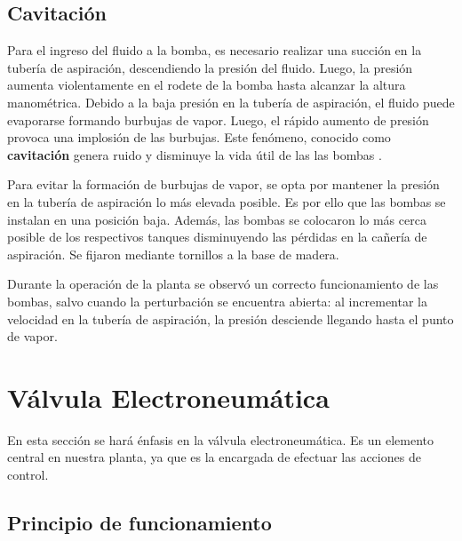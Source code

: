 \subsection{Cavitación}
\label{subsec:cavitacion}
Para el ingreso del fluido a la bomba, es necesario realizar una succión
en la tubería de aspiración, descendiendo la presión del fluido.
Luego, la presión aumenta violentamente en el rodete de la bomba hasta alcanzar
la altura manométrica.
Debido a la baja presión en la tubería de aspiración, el fluido puede
evaporarse formando burbujas de vapor.
Luego, el rápido aumento de presión provoca una implosión de las burbujas.
Este fenómeno, conocido como \textbf{cavitación} genera ruido y disminuye la
vida útil de las las bombas \cite{bib:ApuntesMDFBombas}.

Para evitar la formación de burbujas de vapor, se opta por mantener la presión
en la tubería de aspiración lo más elevada posible.
Es por ello que las bombas se instalan en una posición baja.
Además, las bombas se colocaron lo más cerca posible de los respectivos
tanques disminuyendo las pérdidas en la cañería de aspiración.
Se fijaron mediante tornillos a la base de madera.

Durante la operación de la planta se observó un correcto funcionamiento de las
bombas, salvo cuando la perturbación se encuentra abierta: al incrementar la
velocidad en la tubería de aspiración, la presión desciende llegando hasta el
punto de vapor.

\section{Válvula Electroneumática}
\label{sec:ValvulaNeumatica}

En esta sección se hará énfasis en la válvula electroneumática.
Es un elemento central en nuestra planta, ya que es la encargada de efectuar
las acciones de control.

\subsection{Principio de funcionamiento}
\label{subsec:principioFuncionamiento}

